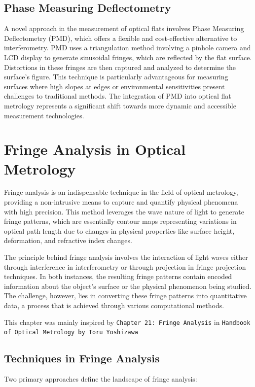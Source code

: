 \documentclass[../main.tex]{subfiles}
\begin{document}
\subsection{Phase Measuring Deflectometry}
A novel approach in the measurement of optical flats involves Phase Measuring Deflectometry (PMD), which offers a flexible and cost-effective alternative to interferometry. PMD uses a triangulation method involving a pinhole camera and LCD display to generate sinusoidal fringes, which are reflected by the flat surface. Distortions in these fringes are then captured and analyzed to determine the surface's figure. This technique is particularly advantageous for measuring surfaces where high slopes at edges or environmental sensitivities present challenges to traditional methods. The integration of PMD into optical flat metrology represents a significant shift towards more dynamic and accessible measurement technologies.\cite{WOS:000385319500019}

\section{Fringe Analysis in Optical Metrology}

Fringe analysis is an indispensable technique in the field of optical metrology, providing a non-intrusive means to capture and quantify physical phenomena with high precision. This method leverages the wave nature of light to generate fringe patterns, which are essentially contour maps representing variations in optical path length due to changes in physical properties like surface height, deformation, and refractive index changes.

The principle behind fringe analysis involves the interaction of light waves either through interference in interferometry or through projection in fringe projection techniques. In both instances, the resulting fringe patterns contain encoded information about the object's surface or the physical phenomenon being studied. The challenge, however, lies in converting these fringe patterns into quantitative data, a process that is achieved through various computational methods.

This chapter was mainly inspired by \texttt{Chapter 21: Fringe Analysis} in \texttt{Handbook of Optical Metrology by Toru Yoshizawa}\cite{fringe_analysis}

\subsection{Techniques in Fringe Analysis}
Two primary approaches define the landscape of fringe analysis:
\end{document}
